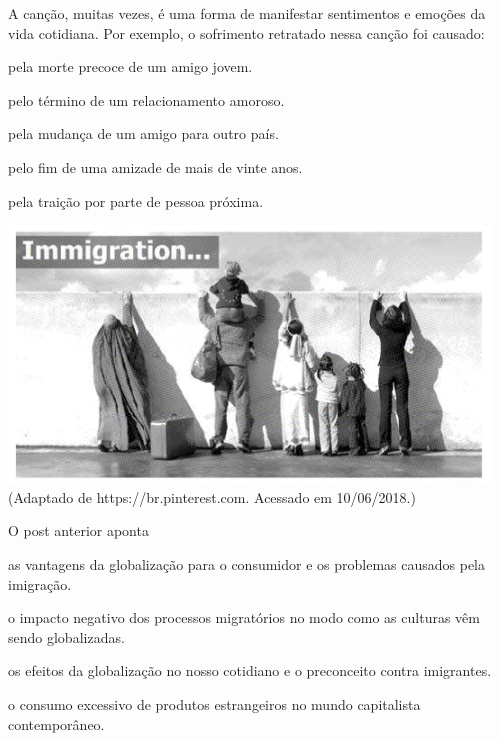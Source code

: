 A canção, muitas vezes, é uma forma de manifestar sentimentos e emoções da vida cotidiana. Por exemplo, o sofrimento retratado nessa canção foi causado:

\begin{alternativas}
  \item pela morte precoce de um amigo jovem.
  \item pelo término de um relacionamento amoroso.
  \item pela mudança de um amigo para outro país.
  \item pelo fim de uma amizade de mais de vinte anos.
  \item pela traição por parte de pessoa próxima.
\end{alternativas}


\questao
\includegraphics[width=\columnwidth]{subareas/linguagens/ingles-1.png}
 {
  (Adaptado de https://br.pinterest.com. Acessado em 10/06/2018.)
}

O post anterior aponta
\begin{alternativas}
  \item as vantagens da globalização para o consumidor e os problemas causados pela imigração.
  \item o impacto negativo dos processos migratórios no modo como as culturas vêm sendo globalizadas.
  \item os efeitos da globalização no nosso cotidiano e o preconceito contra imigrantes.
  \item o consumo excessivo de produtos estrangeiros no mundo capitalista contemporâneo.
\end{alternativas}

